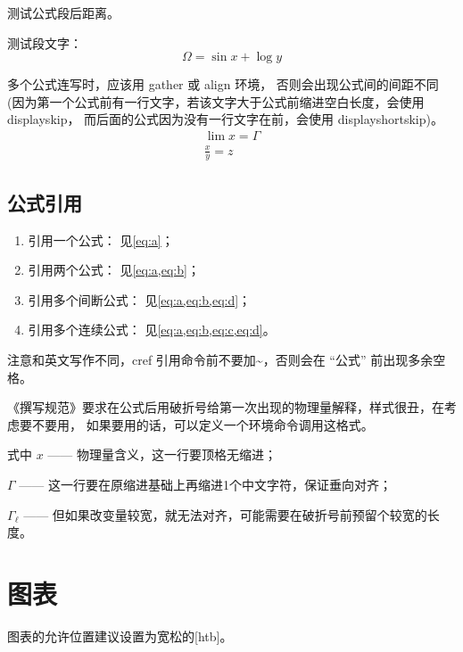 \documentclass{swputhesis}
\begin{document}
测试公式段后距离。

测试段文字：
%
\begin{equation}	\label{eq:b}
	\Omega = \sin x + \log y
\end{equation}

多个公式连写时，应该用 gather 或 align 环境， 否则会出现公式间的间距不同
(因为第一个公式前有一行文字，若该文字大于公式前缩进空白长度，会使用 displayskip，
而后面的公式因为没有一行文字在前，会使用 displayshortskip)。
%
\begin{gather}
	\lim x = \Gamma	\label{eq:c} \\
	\frac{x}{y} = z	\label{eq:d}
\end{gather}

\subsection{公式引用}

\begin{enumerate}
	\item 引用一个公式： 见\cref{eq:a}；
	\item 引用两个公式： 见\cref{eq:a,eq:b}；
	\item 引用多个间断公式： 见\cref{eq:a,eq:b,eq:d}；
	\item 引用多个连续公式： 见\cref{eq:a,eq:b,eq:c,eq:d}。
\end{enumerate}

注意和英文写作不同，cref 引用命令前不要加\~{}，否则会在 ``公式'' 前出现多余空格。

《撰写规范》要求在公式后用破折号给第一次出现的物理量解释，样式很丑，在考虑要不要用，
如果要用的话，可以定义一个环境命令调用这格式。

\noindent 式中\hspace{\ccwd} $x$ —— 物理量含义，这一行要顶格无缩进；

\hspace{\ccwd} $\Gamma$ —— 这一行要在原缩进基础上再缩进1个中文字符，保证垂向对齐；

\hspace{\ccwd} $\Gamma_\ell$ —— 
但如果改变量较宽，就无法对齐，可能需要在破折号前预留个较宽的长度。

\section{图表}

图表的允许位置建议设置为宽松的[htb]。
\end{document}
